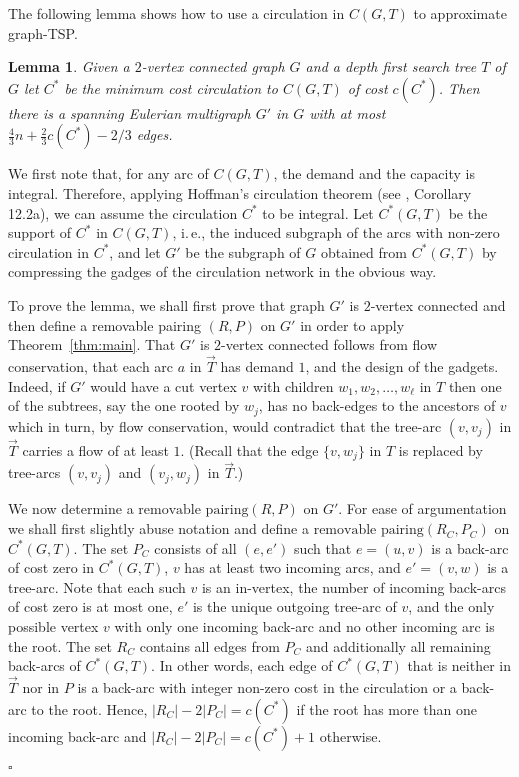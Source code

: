\documentclass[letterpaper,11pt]{article}
\newtheorem{lemma}[theorem]{Lemma}
\newenvironment{proof}{\begin{trivlist}
\item[\hskip\labelsep {\bf Proof}.]}{\QED \end{trivlist}}
\newcommand{\QED}{\hfill $\square$}
\newcommand{\MS}{\ensuremath{\mbox{removable pairing}}\xspace}
\newcommand{\oa}[1]{\ensuremath{\overrightarrow{#1}}}
\newcommand{\TSP}{graph-TSP\xspace}
\begin{document}
The following lemma shows how to use a circulation in $C(G,T)$ to approximate
\TSP.
\begin{lemma}
\label{lemma:costcirc}
Given a $2$-vertex connected graph $G$ and a depth first search tree
$T$ of $G$ let $C^*$ be the minimum cost circulation to $C(G,T)$ of
cost $c(C^*)$. Then there is a spanning Eulerian multigraph $G'$ in
$G$ with at most $\frac{4}{3} n + \frac{2}{3} c(C^*) - 2/3$ edges.
\end{lemma}
\begin{proof}
  \newcommand{\flowT}{\ensuremath{\oa{T}}}
  \newcommand{\graphC}{\ensuremath{{C^*(G,T)}}} We first note that,
  for any arc of $C(G,T)$, the demand and the capacity is integral.
  Therefore, applying Hoffman's circulation theorem (see \cite{Sch03},
  Corollary 12.2a), we can assume the circulation $C^*$ to be
  integral.  Let $\graphC$ be the support of $C^*$ in $C(G,T)$,
  i.\,e., the induced subgraph of the arcs with non-zero circulation
  in $C^*$, and let $G'$ be the subgraph of $G$ obtained from
  $\graphC$ by compressing the gadges of the circulation network in
  the obvious way. 

  To prove the lemma, we shall first prove that graph $G'$ is
  $2$-vertex connected and then define a removable pairing $(R,P)$ on
  $G'$ in order to apply Theorem~\ref{thm:main}. That $G'$ is
  $2$-vertex connected follows from flow conservation, that each arc
  $a$ in $\oa{T}$ has demand $1$, and the design of the
  gadgets. Indeed, if $G'$ would have a cut vertex $v$ with children
  $w_1, w_2, \ldots, w_\ell$ in $T$ then one of the subtrees, say the
  one rooted by $w_j$, has no back-edges to the ancestors of $v$ which
  in turn, by flow conservation, would contradict that the tree-arc
  $(v, v_j)$ in $\oa{T}$ carries a flow of at least $1$. (Recall that
  the edge $\{v, w_j\}$ in $T$ is replaced by tree-arcs $(v, v_j)$ and
  $(v_j, w_j)$ in $\oa{T}$.)

  We now determine a \MS $(R,P)$ on $G'$. For ease of argumentation we
  shall first slightly abuse notation and define a \MS $(R_C, P_C)$ on
  $\graphC$.
  The set $P_C$ consists of all $(e,e')$ such that $e=(u,v)$ is a
  back-arc of cost zero in $\graphC$, $v$ has at least two incoming
  arcs, and $e'=(v,w)$ is a tree-arc.  Note that each such $v$ is an
  in-vertex, the number of incoming back-arcs of cost zero is at most
  one, $e'$ is the unique outgoing tree-arc of $v$, and the only
  possible vertex $v$ with only one incoming back-arc and no other
  incoming arc is the root.
  The set $R_C$ contains all edges from $P_C$ and additionally all
  remaining back-arcs of $\graphC$.  In other words, each edge of
  $\graphC$ that is neither in $\oa{T}$ nor in $P$ is a back-arc with
  integer non-zero cost in the circulation or a back-arc to the
  root. Hence, $|R_C| - 2|P_C| = c(C^*)$ if the root has more than one
  incoming back-arc and $|R_C|- 2|P_C| = c(C^*) +1$ otherwise.


\end{proof}
\end{document}
